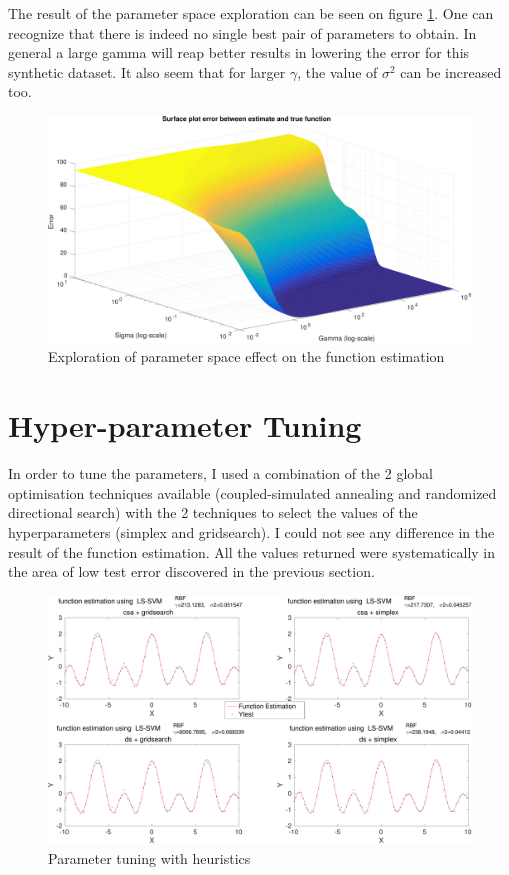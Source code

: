 \documentclass[11pt, a4paper]{article}
\begin{document}
The result of the parameter space exploration can be seen on figure
\ref{fig:sumcos_surf}. One can recognize that there is indeed no
single best pair of parameters to obtain. In general a large gamma
will reap better results in lowering the error for this synthetic
dataset. It also seem that for larger $\gamma$, the value of
$\sigma^2$ can be increased too.

\begin{figure}[H]
  \vspace{-60pt}
    \centering
    \includegraphics[scale=.40]{sumcos_surf.pdf}
    \caption{Exploration of parameter space effect on the function estimation}
    \label{fig:sumcos_surf}
\end{figure}



\section{Hyper-parameter Tuning}

In order to tune the parameters, I used a combination of the 2 global
optimisation techniques available (coupled-simulated annealing and
randomized directional search) with the 2 techniques to select the
values of the hyperparameters (simplex and gridsearch). I could not
see any difference in the result of the function estimation. All the
values returned were systematically in the area of low test error
discovered in the previous section.

\begin{figure}[H]
    \centering
    \includegraphics[scale=.40]{hyperparam_tuning.pdf}
    \caption{Parameter tuning with heuristics}
    \label{fig:hyperparam_tuning}
\end{figure}
\end{document}

